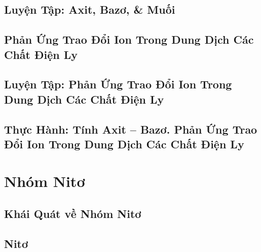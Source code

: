 \documentclass[oneside]{book}
\numberwithin{equation}{section}
\begin{document}

\section{Luyện Tập: Axit, Bazơ, \& Muối}


\section{Phản Ứng Trao Đổi Ion Trong Dung Dịch Các Chất Điện Ly}


\section{Luyện Tập: Phản Ứng Trao Đổi Ion Trong Dung Dịch Các Chất Điện Ly}


\section{Thực Hành: Tính Axit -- Bazơ. Phản Ứng Trao Đổi Ion Trong Dung Dịch Các Chất Điện Ly}


\chapter{Nhóm Nitơ}

\section{Khái Quát về Nhóm Nitơ}


\section{Nitơ}

\end{document}
